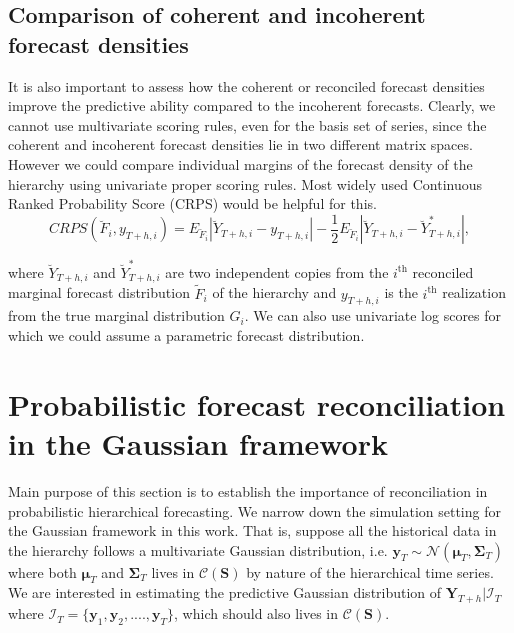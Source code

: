 \documentclass[a4paper, 11pt]{article}
\begin{document}
\subsection{Comparison of coherent and incoherent forecast densities}

It is also important to assess how the coherent or reconciled forecast densities improve the predictive ability compared to the incoherent forecasts. Clearly, we cannot use multivariate scoring rules, even for the basis set of series, since the coherent and incoherent forecast densities lie in two different matrix spaces.\\

\noindent
However we could compare individual margins of the forecast density of the hierarchy using univariate proper scoring rules. Most widely used Continuous Ranked Probability Score (CRPS) would be helpful for this. \\
\begin{equation} \label{eq:(3.6)}
CRPS(\breve{F}_i,y_{T+h,i}) = E_{\breve{F}_i}|\breve{Y}_{T+h,i}-y_{T+h,i}| - \frac{1}{2}E_{\breve{F}_i}|\breve{Y}_{T+h,i}-\breve{Y}^*_{T+h,i}|,
\end{equation}
       
\noindent
where $\breve{Y}_{T+h,i}$ and $\breve{Y}^*_{T+h,i}$ are two independent copies from the $i^{\text{th}}$ reconciled marginal forecast distribution $\tilde{F}_i$ of the hierarchy and $y_{T+h,i}$ is the $i^{\text{th}}$ realization from the true marginal distribution $G_i$. We can also use univariate log scores for which we could assume a parametric forecast distribution.
 



\section{Probabilistic forecast reconciliation in the Gaussian framework}


Main purpose of this section is to establish the importance of reconciliation in probabilistic hierarchical forecasting. We narrow down the simulation setting for the Gaussian framework in this work. That is, suppose all the historical data in the hierarchy follows a multivariate Gaussian distribution, i.e. $\bm{y}_T \sim \mathscr{N}(\bm{\mu}_T, \bm{\Sigma}_T)$ where both $\bm{\mu}_T$ and $\bm{\Sigma}_T$ lives in $\mathscr{C}(\bm{S})$ by nature of the hierarchical time series. We are interested in estimating the predictive Gaussian distribution of $\bm{Y}_{T+h}| \bm{\mathcal{I}}_T$ where $\bm{\mathcal{I}}_T= \{\bm{y}_1,\bm{y}_2,....,\bm{y}_T\}$, which should also lives in $\mathscr{C}(\bm{S})$. \\
\end{document}

